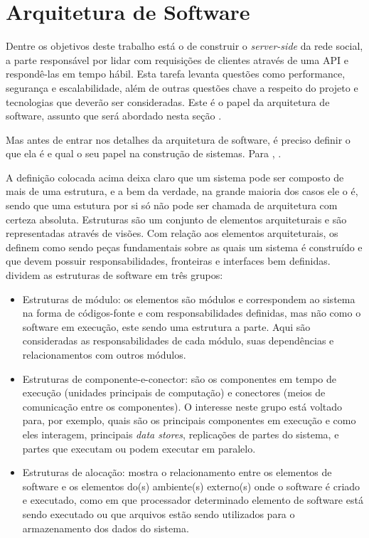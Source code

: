 \documentclass[diss]{template/setrem}
\begin{document}
\section{Arquitetura de Software}
Dentre os objetivos deste trabalho está o de construir o \emph{server-side} da rede social, a parte responsável por lidar com requisições de clientes através de uma API e respondê-las em tempo hábil. Esta tarefa levanta questões como performance, segurança e escalabilidade, além de outras questões chave a respeito do projeto e tecnologias que deverão ser consideradas. Este é o papel da arquitetura de software, assunto que será abordado nesta seção \citep{Gorton2011}.

Mas antes de entrar nos detalhes da arquitetura de software, é preciso definir o que ela é e qual o seu papel na construção de sistemas. Para \citet[seção 2.1]{Bass2003}, .

A definição colocada acima deixa claro que um sistema pode ser composto de mais de uma estrutura, e a bem da verdade, na grande maioria dos casos ele o é, sendo que uma estutura por si só não pode ser chamada de arquitetura com certeza absoluta. Estruturas são um conjunto de elementos arquiteturais e são representadas através de visões. Com relação aos elementos arquiteturais, \citet{Rozanski2005} os definem como sendo peças fundamentais sobre as quais um sistema é construído e que devem possuir responsabilidades, fronteiras e interfaces bem definidas. \citet{Bass2003} dividem as estruturas de software em três grupos:

\begin{itemize}
	\item Estruturas de módulo: os elementos são módulos e correspondem ao sistema na forma de códigos-fonte e com responsabilidades definidas, mas não como o software em execução, este sendo uma estrutura a parte. Aqui são consideradas as responsabilidades de cada módulo, suas dependências e relacionamentos com outros módulos.
	\item Estruturas de componente-e-conector: são os componentes em tempo de execução (unidades principais de computação) e conectores (meios de comunicação entre os componentes). O interesse neste grupo está voltado para, por exemplo, quais são os principais componentes em execução e como eles interagem, principais \emph{data stores}, replicações de partes do sistema, e partes que executam ou podem executar em paralelo.
	\item Estruturas de alocação: mostra o relacionamento entre os elementos de software e os elementos do(s) ambiente(s) externo(s) onde o software é criado e executado, como em que processador determinado elemento de software está sendo executado ou que arquivos estão sendo utilizados para o armazenamento dos dados do sistema.
\end{itemize}
\end{document}
